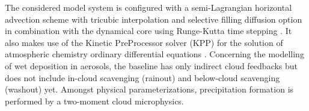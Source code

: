 The considered  \cosmoart model  system is configured  with a
semi-Lagrangian    horizontal   advection    sche\-me    with   tricubic
interpolation  and selective filling  diffusion option  in combination
with   the   dynamical    core   using   Runge-Kutta   time   stepping
\cite{COSMO-PartI-2011}.    It  also   makes  use   of   the  Kinetic
PreProcessor solver (KPP) for  the solution of atmospheric chemistry
ordinary  differential equations \cite{Damian-2002}.   Concerning the
modelling  of  wet  deposition  in  aerosols, the  baseline  has  only
indirect  cloud feedbacks  but  does not  include in-cloud  scavenging
(rainout) and below-cloud  scavenging (washout) yet.  Amongst physical
parameterizations,   precipitation  formation   is   performed  by   a
two-moment cloud microphysics.
